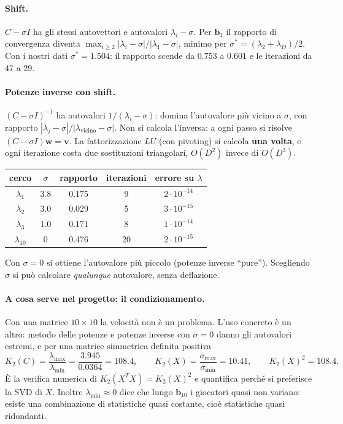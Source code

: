 \documentclass[11pt,a4paper]{article}
\theoremstyle{remark}
\newcommand{\bb}{\mathbf{b}}
\begin{document}
\paragraph{Shift.} $C-\sigma I$ ha gli stessi autovettori e autovalori $\lambda_i-\sigma$.
Per $\bb_1$ il rapporto di convergenza diventa $\max_{i\ge2}|\lambda_i-\sigma|/|\lambda_1-\sigma|$,
minimo per $\sigma^*=(\lambda_2+\lambda_D)/2$. Con i nostri dati $\sigma^*=1.504$: il rapporto scende
da $0.753$ a $0.601$ e le iterazioni da 47 a 29.

\paragraph{Potenze inverse con shift.} $(C-\sigma I)^{-1}$ ha autovalori $1/(\lambda_i-\sigma)$: domina
l'autovalore pi\`u vicino a $\sigma$, con rapporto
$|\lambda_j-\sigma|/|\lambda_{\text{vicino}}-\sigma|$. Non si calcola l'inversa: a ogni passo si risolve
$(C-\sigma I)\mathbf w=\mathbf v$. La fattorizzazione $LU$ (con pivoting) si calcola \textbf{una volta},
e ogni iterazione costa due sostituzioni triangolari, $O(D^2)$ invece di $O(D^3)$.
\begin{center}
\begin{tabular}{ccccc}
\toprule
cerco & $\sigma$ & rapporto & iterazioni & errore su $\lambda$\\
\midrule
$\lambda_1$ & 3.8 & 0.175 & 9 & $2\cdot10^{-14}$\\
$\lambda_2$ & 3.0 & 0.029 & 5 & $3\cdot10^{-15}$\\
$\lambda_3$ & 1.0 & 0.171 & 8 & $1\cdot10^{-14}$\\
$\lambda_{10}$ & 0 & 0.476 & 20 & $2\cdot10^{-15}$\\
\bottomrule
\end{tabular}
\end{center}
Con $\sigma=0$ si ottiene l'autovalore pi\`u piccolo (potenze inverse ``pure'').
Scegliendo $\sigma$ si pu\`o calcolare \emph{qualunque} autovalore, senza deflazione.

\paragraph{A cosa serve nel progetto: il condizionamento.}
Con una matrice $10\times10$ la velocit\`a non \`e un problema. L'uso concreto \`e un altro:
metodo delle potenze e potenze inverse con $\sigma=0$ danno gli autovalori estremi, e per una
matrice simmetrica definita positiva
\[
K_2(C)=\frac{\lambda_{\max}}{\lambda_{\min}}=\frac{3.945}{0.0364}=108.4,
\qquad
K_2(X)=\frac{\sigma_{\max}}{\sigma_{\min}}=10.41,\qquad K_2(X)^2=108.4 .
\]
\`E la verifica numerica di $K_2(X^TX)=K_2(X)^2$ e quantifica perch\'e si preferisce la SVD di $X$.
Inoltre $\lambda_{\min}\approx 0$ dice che lungo $\bb_{10}$ i giocatori quasi non variano: esiste una
combinazione di statistiche quasi costante, cio\`e statistiche quasi ridondanti.
\end{document}

